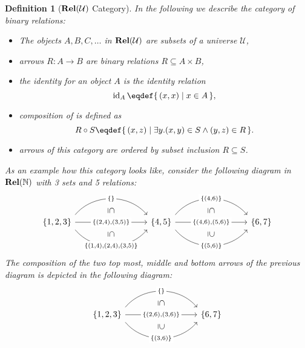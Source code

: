 \documentclass{article}
\newtheorem{definition}[theorem]{Definition}
\begin{document}
\begin{definition}[$\mathbf{Rel}(\mathcal{U})$ Category] \normalfont
  In the following we describe the category of binary relations:
  \begin{itemize}
  \item The objects $A,B,C,\ldots$ in $\mathbf{Rel}(\mathcal{U})$ are subsets of a universe $\mathcal{U}$,
  \item arrows $R: A \rightarrow B$ are binary relations $R \subseteq A \times B$,
  \item the identity for an object $A$ is the identity relation \[\id_A \eqdef \setbuild{ (x,x) }{ x \in A },\]
  \item composition of is defined as \[R \circ S \eqdef \setbuild{(x,z)}{ \exists y. (x,y) \in S \land (y,z) \in R }.\]
  \item arrows of this category are ordered by subset inclusion $R \subseteq S$.
  \end{itemize}
  As an example how this category looks like, consider the following diagram in $\mathbf{Rel}(\mathbb{N})$ with 3 sets and 5 relations:
  \[
  \begin{tikzcd}[column sep=3cm]
    \{1,2,3\} \arrow[bend left=50,start anchor=north east,end anchor=north west]{r}[name=X,description]{\{\}} \arrow{r}[name=Y,description]{\{(2,4),(3,5)\}} \arrow[bend right=50,start anchor=south east,end anchor=south west]{r}[name=Z,description]{\{ (1,4),(2,4),(3,5) \}} \ar[from=X,to=Y,phantom,"\subseteq"{sloped,rotate=180}] \ar[from=Y,to=Z,phantom,"\subseteq"{sloped}] & \{4,5\} \arrow[bend left=50,start anchor=north east,end anchor=north west]{r}[name=XX,description]{\{(4,6)\}} \arrow{r}[name=YY,description]{\{(4,6),(5,6)\}} \arrow[bend right=50,start anchor=south east,end anchor=south west]{r}[name=ZZ,description]{\{(5,6)\}} \ar[from=XX,to=YY,phantom,"\subseteq"{sloped}] \ar[from=ZZ,to=YY,phantom,"\supseteq"{sloped,rotate=180}] & \{6,7\}
  \end{tikzcd}
  \]
  The composition of the two top most, middle and bottom arrows of the previous diagram is depicted in the following diagram:
  \[
  \begin{tikzcd}[column sep=1.5cm]
    \{1,2,3\} \arrow[bend left=50,start anchor=north east,end anchor=north west]{rr}[name=X,description]{\{\}} \arrow{rr}[name=Y,description]{\{(2,6),(3,6)\}} \arrow[bend right=50,start anchor=south east,end anchor=south west]{rr}[name=Z,description]{\{ (3,6) \}} \ar[from=X,to=Y,phantom,"\subseteq"{sloped}] \ar[from=Z,to=Y,phantom,"\supseteq"{sloped,rotate=180}] & & \{6,7\}
  \end{tikzcd}
\]
\end{definition}
\end{document}
